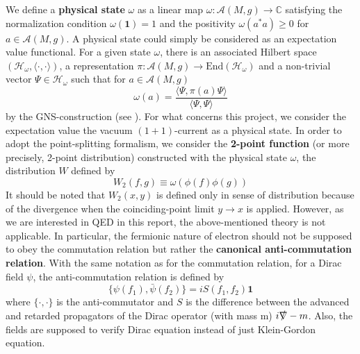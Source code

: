 %
We define a \textbf{physical state} $\omega$ as a linear map
$\omega: \mathscr{A}(M,g) \rightarrow \mathbb{C}$ satisfying the normalization condition $\omega(\mathbf{1}) = 1$ and the positivity $\omega(a^*a) \geq 0$ for $a\in\mathscr{A}(M,g)$.
A physical state could simply be considered as an expectation value functional. 
For a given state $\omega$, there is an associated Hilbert space $(\mathscr{H}_\omega, \langle \cdot, \cdot \rangle)$, a representation $\pi : \mathscr{A}(M,g)\rightarrow \mathrm{End}(\mathscr{H}_\omega)$ and a non-trivial vector $\Psi \in \mathscr{H}_\omega$ such that for $a \in \mathscr{A}(M,g)$
\begin{equation*}
\omega(a) = \frac{\langle \Psi, \pi(a)\Psi\rangle}{\langle \Psi, \Psi \rangle}
\end{equation*}
by the GNS-construction (see \eg\cite{bar2009quantum}).
For what concerns this project, we consider the expectation value the vacuum $(1+1)$-current as a physical state.
%
In order to adopt the point-splitting formalism, 
we consider the \textbf{2-point function} (or more precisely, 2-point distribution) constructed with the physical state $\omega$, 
\ie the distribution $W$ defined by 
\begin{equation*}
W_2(f, g ) \equiv \omega(\phi(f) \phi(g))
\end{equation*}
It should be noted that $W_2(x,y)$ is defined only in sense of distribution because of the divergence when the coinciding-point limit $y\rightarrow x$ is applied.
However, as we are interested in QED in this report, the above-mentioned theory is not applicable. 
In particular, the fermionic nature of electron should not be supposed to obey the commutation relation but rather the \textbf{canonical anti-commutation relation}.
With the same notation as for the commutation relation, 
for a Dirac field $\psi$, the anti-commutation relation is defined by
\begin{equation*}
\{\psi(f_1), \bar{\psi}(f_2)\} = i S(f_1, f_2) \mathbf{1}
\end{equation*}
where $\{\cdot, \cdot\}$ is the anti-commutator and $S$ is the difference between the advanced and retarded propagators of the Dirac operator (with mass m) $i\slashed{\nabla} - m$.
Also, the fields are supposed to verify Dirac equation instead of just Klein-Gordon equation. 

